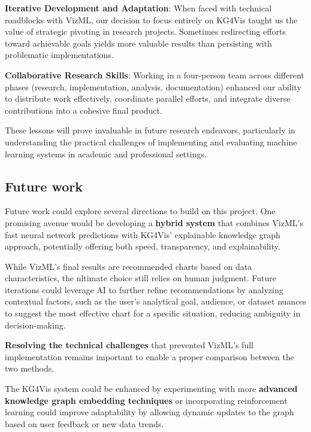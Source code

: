 \vspace{1em}
\noindent \textbf{Iterative Development and Adaptation}: When faced with technical roadblocks with VizML, our decision to focus entirely on KG4Vis taught us the value of strategic pivoting in research projects. Sometimes redirecting efforts toward achievable goals yields more valuable results than persisting with problematic implementations.

\vspace{1em}
\noindent \textbf{Collaborative Research Skills}: Working in a four-person team across different phases (research, implementation, analysis, documentation) enhanced our ability to distribute work effectively, coordinate parallel efforts, and integrate diverse contributions into a cohesive final product.

\vspace{1em}
\noindent These lessons will prove invaluable in future research endeavors, particularly in understanding the practical challenges of implementing and evaluating machine learning systems in academic and professional settings.	

\vspace{2.0cm}
\subsection{Future work} 
 
Future work could explore several directions to build on this project. One promising avenue would be developing a \textbf{hybrid system} that combines VizML's fast neural network predictions with KG4Vis' explainable knowledge graph approach, potentially offering both speed, transparency, and explainability. 

While VizML’s final results are recommended charts based on data characteristics, the ultimate choice still relies on human judgment. Future iterations could leverage AI to further refine recommendations by analyzing contextual factors, such as the user’s analytical goal, audience, or dataset nuances to suggest the most effective chart for a specific situation, reducing ambiguity in decision-making.

\textbf{Resolving the technical challenges} that prevented VizML's full implementation remains important to enable a proper comparison between the two methods. 

The KG4Vis system could be enhanced by experimenting with more \textbf{advanced knowledge graph embedding techniques} or incorporating reinforcement learning could improve adaptability by allowing dynamic updates to the graph based on user feedback or new data trends.

